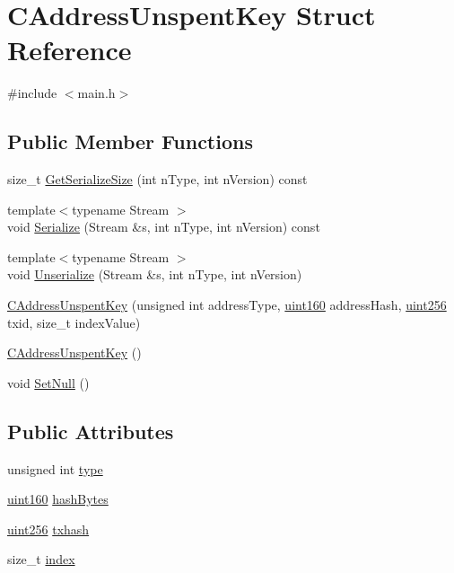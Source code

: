 \hypertarget{struct_c_address_unspent_key}{}\section{C\+Address\+Unspent\+Key Struct Reference}
\label{struct_c_address_unspent_key}


{\ttfamily \#include $<$main.\+h$>$}

\subsection*{Public Member Functions}
\begin{DoxyCompactItemize}
\item 
size\+\_\+t \mbox{\hyperlink{struct_c_address_unspent_key_a7316c9619d6ee1b23e47640c75d543ac}{Get\+Serialize\+Size}} (int n\+Type, int n\+Version) const
\item 
{\footnotesize template$<$typename Stream $>$ }\\void \mbox{\hyperlink{struct_c_address_unspent_key_a59c7a0de19ed642dce3720d118a7c978}{Serialize}} (Stream \&s, int n\+Type, int n\+Version) const
\item 
{\footnotesize template$<$typename Stream $>$ }\\void \mbox{\hyperlink{struct_c_address_unspent_key_ac2560c733399f738c33ad11a53ef9b75}{Unserialize}} (Stream \&s, int n\+Type, int n\+Version)
\item 
\mbox{\hyperlink{struct_c_address_unspent_key_af6201be0b95ce32088d3caa3f9882216}{C\+Address\+Unspent\+Key}} (unsigned int address\+Type, \mbox{\hyperlink{classuint160}{uint160}} address\+Hash, \mbox{\hyperlink{classuint256}{uint256}} txid, size\+\_\+t index\+Value)
\item 
\mbox{\hyperlink{struct_c_address_unspent_key_a4214fcda8c15ed1dba7adb23921a2dfb}{C\+Address\+Unspent\+Key}} ()
\item 
void \mbox{\hyperlink{struct_c_address_unspent_key_a0960f9a707b13deb87151cfdbcaaf9f0}{Set\+Null}} ()
\end{DoxyCompactItemize}
\subsection*{Public Attributes}
\begin{DoxyCompactItemize}
\item 
unsigned int \mbox{\hyperlink{struct_c_address_unspent_key_ad4a70a320b93ab806f2605e7dbb75548}{type}}
\item 
\mbox{\hyperlink{classuint160}{uint160}} \mbox{\hyperlink{struct_c_address_unspent_key_a9137a7113ed72553cc8950ea37edb501}{hash\+Bytes}}
\item 
\mbox{\hyperlink{classuint256}{uint256}} \mbox{\hyperlink{struct_c_address_unspent_key_afc2862de02247c4f2538aa8a43c574a4}{txhash}}
\item 
size\+\_\+t \mbox{\hyperlink{struct_c_address_unspent_key_a9c9eb2228b990dd31574df8137e9d242}{index}}
\end{DoxyCompactItemize}


